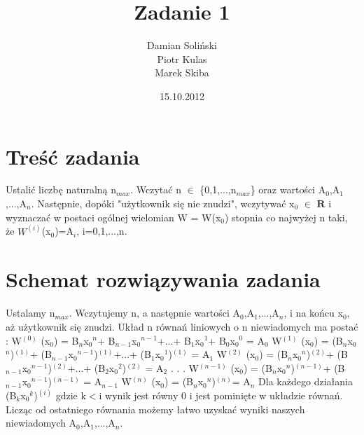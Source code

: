 \documentclass[11pt]{article}
\title{\textbf{Zadanie 1}}
\author{Damian Soliński\\
		Piotr Kulas\\
		Marek Skiba}
\date{15.10.2012}
\begin{document}
\maketitle

\section{Treść zadania}

Ustalić liczbę naturalną n$_{max}$. Wczytać n $\in$ \{0,1,...,n$_{max}$\} oraz wartości A$_{0}$,A$_{1}$,...,A$_{n}$. Następnie, dopóki "użytkownik się nie znudzi", wczytywać x$_{0}$ $\in$ $\mathbf{R}$ i wyznaczać w postaci ogólnej wielomian W = W(x$_{0}$) stopnia co najwyżej n taki, że $W^{(i)}$(x$_{0}$)=A$_{i}$,  i=0,1,...,n.  
\section{Schemat rozwiązywania zadania}
Ustalamy n$_{max}$. Wczytujemy n, a następnie wartości A$_{0}$,A$_{1}$,...,A$_{n}$, i na końcu x$_{0}$, aż użytkownik się znudzi. Układ n równań liniowych o n niewiadomych ma postać :  \newline
W$^{(0)}$ (x$_{0}$) = B$_{n}$x$_{0}$$^{n}$+ B$_{n-1}$x$_{0}$$^{n-1}$+...+ B$_{1}$x$_{0}$$^{1}$+ B$_{0}$x$_{0}$$^{0}$ = A$_{0}$ \newline
W$^{(1)}$ (x$_{0}$) = (B$_{n}$x$_{0}$$^{n}$)$^{(1)}$+ (B$_{n-1}$x$_{0}$$^{n-1}$)$^{(1)}$+...+ (B$_{1}$x$_{0}$$^{1}$)$^{(1)}$ = A$_{1}$ \newline
W$^{(2)}$ (x$_{0}$) = (B$_{n}$x$_{0}$$^{n}$)$^{(2)}$+ (B$_{n-1}$x$_{0}$$^{n-1}$)$^{(2)}$+...+ (B$_{2}$x$_{0}$$^{2}$)$^{(2)}$ = A$_{2}$ \newline
. \newline . \newline . \newline
W$^{(n-1)}$ (x$_{0}$) = (B$_{n}$x$_{0}$$^{n}$)$^{(n-1)}$+ (B$_{n-1}$x$_{0}$$^{n-1}$)$^{(n-1)}$ = A$_{n-1}$ \newline
W$^{(n)}$ (x$_{0}$) = (B$_{n}$x$_{0}$$^{n}$)$^{(n)}$= A$_{n}$ \newline
\newline Dla każdego działania (B$_{k}$x$_{0}$$^{k}$)$^{(i)}$ gdzie k$<$i wynik jest równy 0 i jest pominięte w układzie równań. \newline Licząc od ostatniego równania możemy łatwo uzyskać wyniki naszych niewiadomych A$_{0}$,A$_{1}$,...,A$_{n}$.
\end{document}
